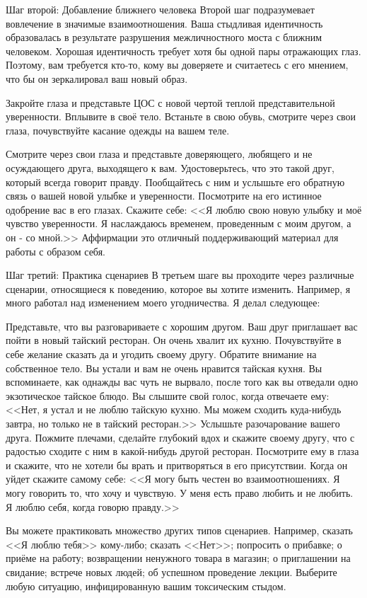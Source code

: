 \documentclass[10pt, fleqn]{article}
\begin{document}
Шаг второй: Добавление ближнего человека
Второй шаг подразумевает вовлечение в значимые взаимоотношения. Ваша стыдливая идентичность образовалась в результате разрушения межличностного моста с ближним человеком. Хорошая идентичность требует хотя бы одной пары отражающих глаз. Поэтому, вам требуется кто-то, кому вы доверяете и считаетесь с его мнением, что бы он зеркалировал ваш новый образ.

Закройте глаза и представьте ЦОС с новой чертой теплой представительной уверенности. Вплывите в своё тело. Встаньте в свою обувь, смотрите через свои глаза, почувствуйте касание одежды на вашем теле.

Смотрите через свои глаза и представьте доверяющего, любящего и не осуждающего друга, выходящего к вам. Удостоверьтесь, что это такой друг, который всегда говорит правду. Пообщайтесь с ним и услышьте его обратную связь о вашей новой улыбке и уверенности. Посмотрите на его истинное одобрение вас в его глазах. Скажите себе: <<Я люблю свою новую улыбку и моё чувство уверенности. Я наслаждаюсь временем, проведенным с моим другом, а он - со мной.>> Аффирмации это отличный поддерживающий материал для работы с образом себя.

Шаг третий: Практика сценариев
В третьем шаге вы проходите через различные сценарии, относящиеся к поведению, которое вы хотите изменить. Например, я много работал над изменением моего угодничества. Я делал следующее:

Представьте, что вы разговариваете с хорошим другом. Ваш друг приглашает вас пойти в новый тайский ресторан. Он очень хвалит их кухню. Почувствуйте в себе желание сказать да и угодить своему другу. Обратите внимание на собственное тело. Вы устали и вам не очень нравится тайская кухня. Вы вспоминаете, как однажды вас чуть не вырвало, после того как вы отведали одно экзотическое тайское блюдо. Вы слышите свой голос, когда отвечаете ему: <<Нет, я устал и не люблю тайскую кухню. Мы можем сходить куда-нибудь завтра, но только не в тайский ресторан.>> Услышьте разочарование вашего друга. Пожмите плечами, сделайте глубокий вдох и скажите своему другу, что с радостью сходите с ним в какой-нибудь другой ресторан. Посмотрите ему в глаза и скажите, что не хотели бы врать и притворяться в его присутствии.
Когда он уйдет скажите самому себе: <<Я могу быть честен во взаимоотношениях. Я могу говорить то, что хочу и чувствую. У меня есть право любить и не любить. Я люблю себя, когда говорю правду.>>

Вы можете практиковать множество других типов сценариев. Например, сказать <<Я люблю тебя>> кому-либо; сказать <<Нет>>; попросить о прибавке; о приёме на работу; возвращении ненужного товара в магазин; о приглашении на свидание; встрече новых людей; об успешном проведение лекции. Выберите любую ситуацию, инфицированную вашим токсическим стыдом.
\end{document}
